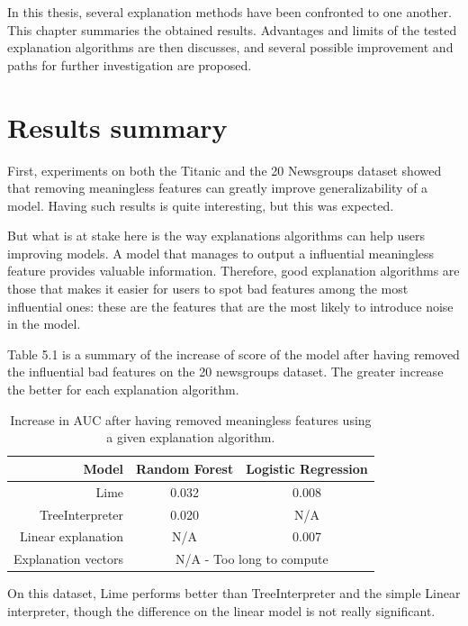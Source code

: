 \documentclass[a4paper,11pt]{kth-mag}
\begin{document}
In this thesis, several explanation methods have been confronted to one another. This chapter summaries the obtained results. Advantages and limits of the tested explanation algorithms are then discusses, and several possible improvement and paths for further investigation are proposed.

\section{Results summary}

First, experiments on both the Titanic and the 20 Newsgroups dataset showed that removing meaningless features can greatly improve generalizability of a model. Having such results is quite interesting, but this was expected.

But what is at stake here is the way explanations algorithms can help users improving models. A model that manages to output a influential meaningless feature provides valuable information. Therefore, good explanation algorithms are those that makes it easier for users to spot bad features among the most influential ones: these are the features that are the most likely to introduce noise in the model.

Table 5.1 is a summary of the increase of score of the model after having removed the influential bad features on the 20 newsgroups dataset. The greater increase the better for each explanation algorithm.

\begin{table}[ht]
\centering
  \begin{tabular}{|r|c|c|}
  	  \hline
	 Model &  \cellcolor{Gray} Random Forest &  \cellcolor{Gray} Logistic Regression \\ \hline
	 Lime & 0.032 & 0.008 \\ \hline
	 TreeInterpreter & 0.020 & N/A \\ \hline
	 Linear explanation & N/A & 0.007 \\ \hline
	 Explanation vectors & \multicolumn{2}{c}{N/A - Too long to compute}
	 \\ \hline
  \end{tabular}
  \caption{Increase in AUC after having removed meaningless features using a given explanation algorithm.}
\end{table}

On this dataset, Lime performs better than TreeInterpreter and the simple Linear interpreter, though the difference on the linear model is not really significant.
\end{document}
